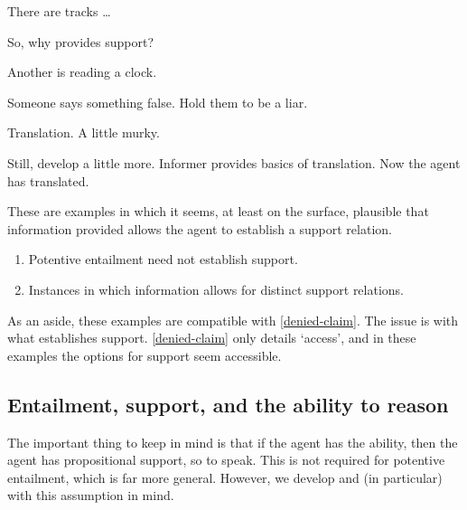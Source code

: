 \begin{note}
  There are tracks \dots

  So, why provides support?

  Another is reading a clock.
\end{note}

\begin{note}[Translation]
  Someone says something false.
  Hold them to be a liar.

  Translation.
  A little murky.

  Still, develop a little more.
  Informer provides basics of translation.
  Now the agent has translated.
\end{note}

\begin{note}
  These are examples in which it seems, at least on the surface, plausible that information provided allows the agent to establish a support relation.
\end{note}

\begin{note}
  \begin{enumerate}
  \item Potentive entailment need not establish support.
  \item Instances in which information allows for distinct support relations.
  \end{enumerate}
\end{note}

\begin{note}
  As an aside, these examples are compatible with \ref{denied-claim}.
  The issue is with what establishes support.
  \ref{denied-claim} only details `access', and in these examples the options for support seem accessible.
\end{note}

\subsection{Entailment, support, and the ability to reason}
\label{sec:enta-supp-abil}

\begin{note}
  The important thing to keep in mind is that if the agent has the ability, then the agent has propositional support, so to speak.
  This is not required for potentive entailment, which is far more general.
  However, we develop \AR{} and (in particular) \WR{} with this assumption in mind.
\end{note}


